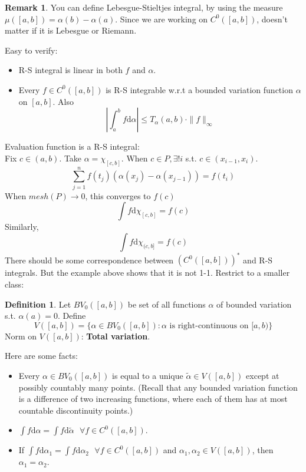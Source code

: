 \documentclass{article}
\theoremstyle{definition}
\newtheorem{dfn}{Definition}
\newtheorem{rem}{Remark}
\newcommand{\sfa}{\text{  } \forall}
\begin{document}
\begin{rem}
	You can define Lebesgue-Stieltjes integral, by using the measure $\mu([a, b]) = \alpha (b) - \alpha(a)$.
	Since we are working on $C^0([a, b])$, doesn't matter if it is Lebesgue or Riemann.
\end{rem}

Easy to verify: 
\begin{itemize}
	\item R-S integral is linear in both $f$ and $\alpha$.
		
	\item Every $f \in C^0([a, b])$ is R-S integrable w.r.t a bounded variation function $\alpha$ on $[a, b]$.
		Also
		\[
			\left|\int_a^b f \mathrm{d} \alpha \right| \leq T_\alpha(a, b) \cdot \|f \|_{\infty}
		\]
\end{itemize}

Evaluation function is a R-S integral:\\
Fix $c \in (a, b)$.
Take $\alpha = \chi_{[c, b]}$.
When $c \in P, \exists ! i$ s.t. $c \in (x_{i - 1}, x_i)$.
\[
	\sum_{j =1}^n f(t_j)(\alpha(x_j) - \alpha(x_{j - 1})) = f(t_i)
\]
When $mesh(P) \to 0$, this converges to $f(c)$
\[
	\int f \mathrm{d} \chi_{[c, b]} = f(c)
\]
Similarly, 
\[
	\int f \mathrm{d} \chi_{(c, b]} = f(c)
\]
There should be some correspondence between $(C^0([a, b]))^*$ and R-S integrals.
But the example above shows that it is not 1-1.
Restrict to a smaller class:

\begin{dfn}
	Let $BV_0([a, b])$ be set of all functions $\alpha$ of bounded variation s.t. $\alpha(a) = 0$.
	Define 
	\[
		V([a, b]) = \{\alpha \in BV_0([a, b]): \alpha \text{ is right-continuous on }[a, b) \}
	\]
	Norm on $V([a, b])$: \textbf{Total variation}.

\end{dfn}

Here are some facts:
\begin{itemize}
	\item Every $\alpha \in BV_0([a, b])$ is equal to a unique $\tilde{\alpha} \in V([a, b])$ except at possibly countably many points.
		(Recall that any bounded variation function is a difference of two increasing functions, where each of them has at most countable discontinuity points.)

	\item $\int f \mathrm{d} \alpha = \int f \mathrm{d} \tilde{\alpha} \sfa f \in C^0([a, b])$.

	\item If $\int f \mathrm{d} \alpha_1 = \int f \mathrm{d} \alpha_2 \sfa f \in C^0([a, b])$ and $\alpha_1, \alpha_2 \in V([a, b])$, then $\alpha_1 = \alpha_2$.
\end{itemize}
\end{document}
